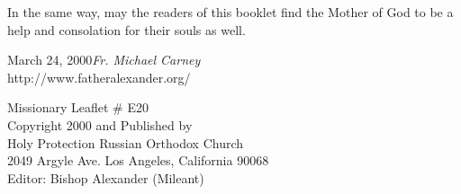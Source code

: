 In the same way, may the readers of this booklet find the Mother of God to be a help and consolation for their souls as well.

\vspace{\baselineskip}

\begin{flushright}\noindent
March 24, 2000\hfill {\it Fr. Michael Carney}\\
http://www.fatheralexander.org/
\end{flushright}

\vspace{\baselineskip}
\vspace{\baselineskip}

{\small \noindent Missionary Leaflet \# E20\\
Copyright 2000 and Published by\\
Holy Protection Russian Orthodox Church\\
2049 Argyle Ave. Los Angeles, California 90068\\
Editor: Bishop Alexander (Mileant)}
